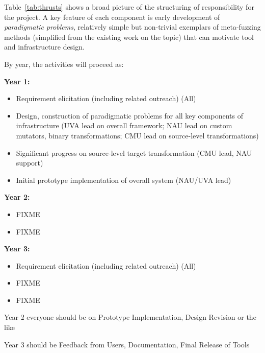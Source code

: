 Table~\ref{tab:thrusts} shows a broad picture of the structuring of
responsibility for the project.  A key feature of each component is early
development of \emph{paradigmatic problems}, relatively simple but
non-trivial exemplars of meta-fuzzing methods (simplified from the
existing work on the topic) that can motivate tool and infrastructure design.

By year, the activities will proceed as:


\noindent\textbf{Year 1:} 
 \begin{itemize}[labelwidth=0.7em, labelsep=0.6em, topsep=0ex, itemsep=0ex,
  parsep=0ex, leftmargin=1.5em]
  \item Requirement elicitation (including related outreach) (All)
  \item Design, construction of paradigmatic problems for all key components of
  infrastructure (UVA lead on overall framework; NAU lead on custom mutators,
  binary transformations; CMU lead on source-level transformations)
  \item Significant progress on source-level target transformation (CMU lead,
  NAU support)
  \item Initial prototype implementation of overall system (NAU/UVA lead)
\end{itemize}

\noindent\textbf{Year 2:}
\begin{itemize}[labelwidth=0.7em, labelsep=0.6em, topsep=0ex, itemsep=0ex,
  parsep=0ex, leftmargin=1.5em]
  \item FIXME 
  \item FIXME
\end{itemize}


\noindent\textbf{Year 3:}
\begin{itemize}[labelwidth=0.7em, labelsep=0.6em, topsep=0ex, itemsep=0ex,
  parsep=0ex, leftmargin=1.5em]
  \item Requirement elicitation (including related outreach) (All)
  \item FIXME
  \item FIXME
\end{itemize}


  Year 2 everyone should be on Prototype Implementation, Design
  Revision or the like

  Year 3 should be Feedback from Users, Documentation, Final Release
  of Tools

